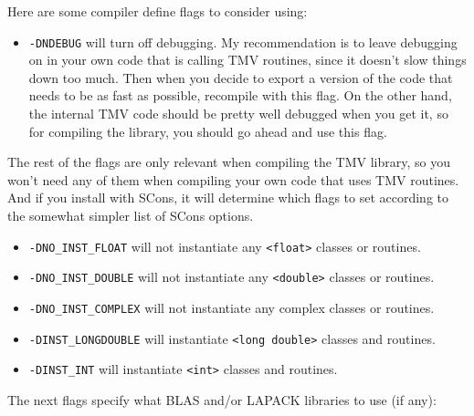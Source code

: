 \documentclass[twoside,letterpaper,11pt]{article}
\renewcommand{\tt}[1]{{\lstinline {#1}}}
\begin{document}
Here are some compiler define flags to consider using:
\begin{itemize}
\item
\texttt{-DNDEBUG} will turn off debugging.  My recommendation is to leave debugging
on in your own code that is calling TMV routines, since it doesn't slow things down too 
much.  Then when you decide to export a version of the code that needs to be as fast 
as possible, recompile with this flag.
On the other hand, the internal TMV code should be pretty well debugged
when you get it, so for compiling the library, you should go ahead and use this flag.
\end{itemize}
The rest of the flags are only relevant when compiling the TMV library, so you won't 
need any of them when compiling your own code that uses TMV routines.  And if you 
install with SCons, it will determine which flags to set according to the somewhat simpler 
list of SCons options.
\begin{itemize}
\item
\texttt{-DNO\_INST\_FLOAT} will not instantiate any \tt{<float>} classes or routines.
\item
\texttt{-DNO\_INST\_DOUBLE} will not instantiate any \tt{<double>} classes or routines.
\item
\texttt{-DNO\_INST\_COMPLEX} will not instantiate any complex classes or routines.
\item
\texttt{-DINST\_LONGDOUBLE} will instantiate \tt{<long double>} classes and routines.
\item
\texttt{-DINST\_INT} will instantiate \tt{<int>} classes and routines.
\end{itemize}
The next flags specify what BLAS and/or LAPACK libraries to use (if any):
\end{document}
